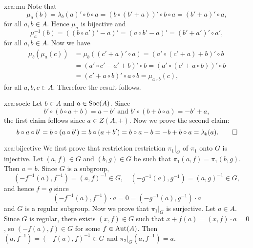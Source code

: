 \begin{sol}{xca:mu}
    Note that
    \[\mu_a(b)=\lambda_b(a)'\circ b\circ a=(b\circ (b'+a))'\circ b\circ a=(b'+a)'\circ a,\]
    for all $a,b\in A$. Hence $\mu_a$ is bijective and
    \[\mu_a^{-1}(b)=((b\circ a')'-a)'=(a\circ b'-a)'=(b'+a')'\circ a',\]
    for all $a,b\in A$. Now we have
    \begin{align*}
        \mu_b(\mu_a(c))&=\mu_b((c'+a)'\circ a)=(a'\circ (c'+a)+b)'\circ b\\
        &=(a'\circ c'-a'+b)'\circ b=(a'\circ (c'+a\circ b))'\circ b\\
        &=(c'+a\circ b)'\circ a\circ b=\mu_{a\circ b}(c),
    \end{align*}
    for all $a,b,c\in A$. Therefore the result follows.
\end{sol}

\begin{sol}{xca:socle}
    Let $b\in A$ and $a\in\operatorname{Soc}(A)$. Since   
    \[
    b'\circ (b\circ a+b)=a-b'
    \text{ and }
    b'\circ (b+b\circ a)=-b'+a,
    \]
    the first claim follows since
    $a\in Z(A,+)$.
    Now we prove the second claim:
    \[
    b\circ a\circ b'=b\circ (a\circ b')=b\circ (a+b')=b\circ a-b=-b+b\circ
    a=\lambda_b(a).\qedhere
    \]
\end{sol}

\begin{sol}{xca:bijective}
	We first prove that restriction restriction $\pi_1|_G$ of $\pi_1$ onto $G$ is injective. Let $(a,f)\in G$ and $(b,g)\in G$
	be such that 
	$\pi_1(a,f)=\pi_1(b,g)$. Then $a=b$. Since $G$ is a
	subgroup, 
	\[
		(-f^{-1}(a),f^{-1})=(a,f)^{-1}\in G,
	    \quad
		(-g^{-1}(a),g^{-1})=(a,g)^{-1}\in G,
	\]
	and hence $f=g$ since
	\[
	(-f^{-1}(a),f^{-1})\cdot a=0=(-g^{-1}(a),g^{-1})\cdot a 
	\]
	and $G$ is a regular subgroup.
	Now we prove that $\pi_1|_G$ is surjective. Let $a\in A$. 
	Since $G$ is regular, there exists $(x,f)\in G$ such that $x+f(a)=(x,f)\cdot a=0$, so $(-f(a),f)\in G$ for some $f\in\operatorname{Aut}(A)$. 
	Then $(a,f^{-1})=(-f(a),f)^{-1}\in G$ and $\pi_2|_G(a,f^{-1})=a$. 
\end{sol}


